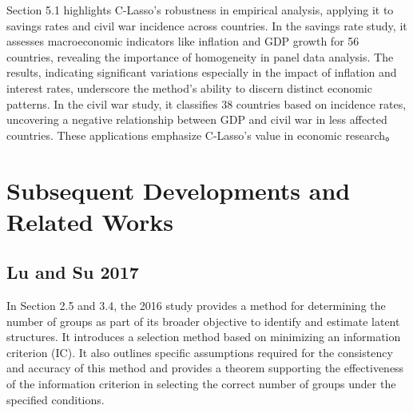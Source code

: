 \documentclass[UTF8,a4paper,10pt]{article}
\begin{document}
Section 5.1 highlights C-Lasso's robustness in empirical analysis, applying it to savings rates and civil war incidence across countries. 
 In the savings rate study, it assesses macroeconomic indicators like inflation and GDP growth for 56 countries, revealing the importance of homogeneity in panel data analysis. The results, indicating significant variations especially in the impact of inflation and interest rates, underscore the method's ability to discern distinct economic patterns. 
 In the civil war study, it classifies 38 countries based on incidence rates, uncovering a negative relationship between GDP and civil war in less affected countries. These applications emphasize C-Lasso's value in economic research。







\section{Subsequent Developments and Related Works}

\subsection{Lu and Su 2017}



In Section 2.5 and 3.4, the 2016 study provides a method for determining the number of groups as part of its broader objective to identify and estimate latent structures. It introduces a selection method based on minimizing an information criterion (IC).
It also outlines specific assumptions required for the consistency and accuracy of this method and provides a theorem supporting the effectiveness of the information criterion in selecting the correct number of groups under the specified conditions​​.
\end{document}
